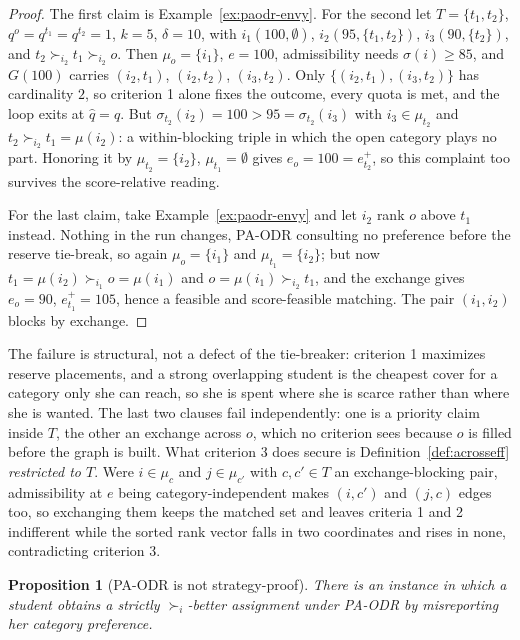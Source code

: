 \documentclass[a4paper,twoside]{article}
\newtheorem{proposition}{Proposition}
\theoremstyle{definition}
\begin{document}
\begin{proof}
The first claim is Example~\ref{ex:paodr-envy}. For the second let $T=\{t_1,t_2\}$, $q^o=q^{t_1}=q^{t_2}=1$, $k=5$, $\delta=10$, with $i_1(100,\emptyset)$, $i_2(95,\{t_1,t_2\})$, $i_3(90,\{t_2\})$, and $t_2\succ_{i_2}t_1\succ_{i_2}o$. Then $\mu_o=\{i_1\}$, $e=100$, admissibility needs $\sigma(i)\ge85$, and $G(100)$ carries $(i_2,t_1)$, $(i_2,t_2)$, $(i_3,t_2)$. Only $\{(i_2,t_1),(i_3,t_2)\}$ has cardinality $2$, so criterion 1 alone fixes the outcome, every quota is met, and the loop exits at $\hat q=q$. But $\sigma_{t_2}(i_2)=100>95=\sigma_{t_2}(i_3)$ with $i_3\in\mu_{t_2}$ and $t_2\succ_{i_2}t_1=\mu(i_2)$: a within-blocking triple in which the open category plays no part. Honoring it by $\mu_{t_2}=\{i_2\}$, $\mu_{t_1}=\emptyset$ gives $e_o=100=e_{t_2}^+$, so this complaint too survives the score-relative reading.

For the last claim, take Example~\ref{ex:paodr-envy} and let $i_2$ rank $o$ above $t_1$ instead. Nothing in the run changes, PA-ODR consulting no preference before the reserve tie-break, so again $\mu_o=\{i_1\}$ and $\mu_{t_1}=\{i_2\}$; but now $t_1=\mu(i_2)\succ_{i_1}o=\mu(i_1)$ and $o=\mu(i_1)\succ_{i_2}t_1$, and the exchange gives $e_o=90$, $e_{t_1}^+=105$, hence a feasible and score-feasible matching. The pair $(i_1,i_2)$ blocks by exchange.
\end{proof}

The failure is structural, not a defect of the tie-breaker: criterion 1 maximizes reserve placements, and a strong overlapping student is the cheapest cover for a category only she can reach, so she is spent where she is scarce rather than where she is wanted. The last two clauses fail independently: one is a priority claim inside $T$, the other an exchange across $o$, which no criterion sees because $o$ is filled before the graph is built. What criterion 3 does secure is Definition~\ref{def:acrosseff} \emph{restricted to $T$}. Were $i\in\mu_c$ and $j\in\mu_{c'}$ with $c,c'\in T$ an exchange-blocking pair, admissibility at $e$ being category-independent makes $(i,c')$ and $(j,c)$ edges too, so exchanging them keeps the matched set and leaves criteria 1 and 2 indifferent while the sorted rank vector falls in two coordinates and rises in none, contradicting criterion 3.

\begin{proposition}[PA-ODR is not strategy-proof]
\label{prop:paodr-notsp}
There is an instance in which a student obtains a strictly $\succ_i$-better assignment under PA-ODR by misreporting her category preference.
\end{proposition}
\end{document}
